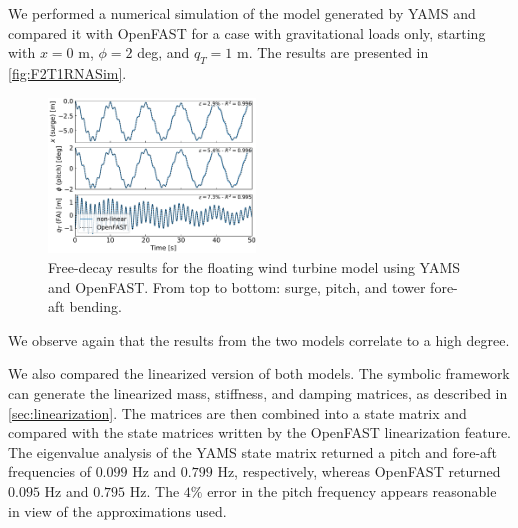 \documentclass[wes, manuscript]{copernicus}
\begin{document}
We performed a numerical simulation of the model generated by YAMS and compared it with OpenFAST for a case with gravitational loads only, starting with $x=0$ \unit{m}, $\phi=2$ \unit{deg}, and $q_T=1$ \unit{m}.
The results are presented in \autoref{fig:F2T1RNASim}.
\noindent\begin{figure}[!htb]\centering%
  \includegraphics[width=0.49\textwidth]{figs/F2T1RNASim}
  \caption{Free-decay results for the floating wind turbine model using YAMS and OpenFAST. From top to bottom: surge, pitch, and tower fore-aft bending.}\label{fig:F2T1RNASim}%
\end{figure}
We observe again that the results from the two models correlate to a high degree.

We also compared the linearized version of both models.
The symbolic framework can generate the linearized mass, stiffness, and damping matrices, as described in \autoref{sec:linearization}.
The matrices are then combined into a state matrix and compared with the state matrices written by the OpenFAST linearization feature.
The eigenvalue analysis of the YAMS state matrix returned a pitch and fore-aft frequencies of $0.099$ \unit{Hz} and $0.799$ \unit{Hz}, respectively, whereas OpenFAST returned $0.095$ \unit{Hz} and $0.795$ \unit{Hz}. The $4\%$ error in the pitch frequency appears reasonable in view of the approximations used.




\end{document}
